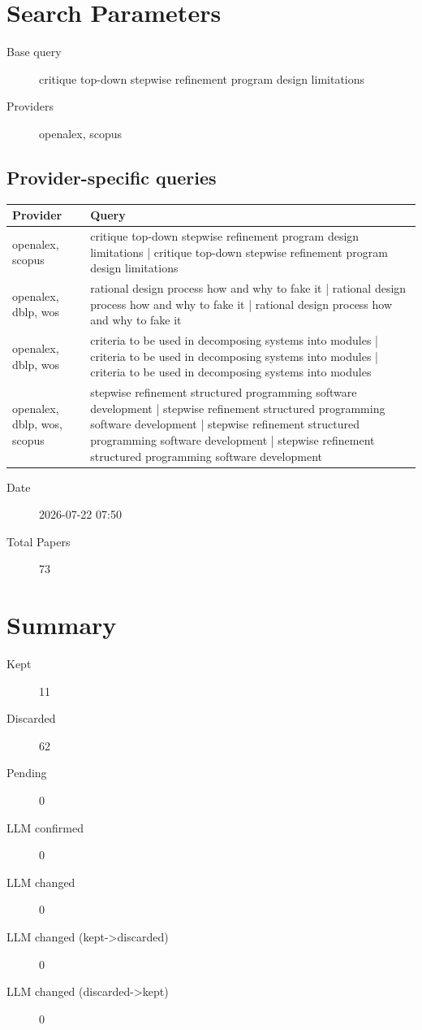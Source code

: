 \documentclass{article}
\begin{document}
\section{Search Parameters}

\begin{description}
\item[Base query] critique top-down stepwise refinement program design limitations
\item[Providers] openalex, scopus
\end{description}

\subsection{Provider-specific queries}
\begin{longtable}{lp{10cm}}
\toprule
Provider & Query \\
\midrule
openalex, scopus & critique top-down stepwise refinement program design limitations | critique top-down stepwise refinement program design limitations \\
openalex, dblp, wos & rational design process how and why to fake it | rational design process how and why to fake it | rational design process how and why to fake it \\
openalex, dblp, wos & criteria to be used in decomposing systems into modules | criteria to be used in decomposing systems into modules | criteria to be used in decomposing systems into modules \\
openalex, dblp, wos, scopus & stepwise refinement structured programming software development | stepwise refinement structured programming software development | stepwise refinement structured programming software development | stepwise refinement structured programming software development \\
\bottomrule
\end{longtable}

\begin{description}
\item[Date] 2026-07-22 07:50
\item[Total Papers] 73
\end{description}

\section{Summary}
\begin{description}
\item[Kept] 11
\item[Discarded] 62
\item[Pending] 0
\item[LLM confirmed] 0
\item[LLM changed] 0
\item[LLM changed (kept->discarded)] 0
\item[LLM changed (discarded->kept)] 0
\end{description}
\end{document}
